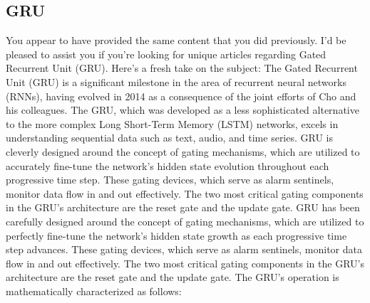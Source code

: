 \documentclass[a4paper,fleqn]{cas-sc}
\begin{document}

\subsection{GRU}
You appear to have provided the same content that you did previously. I’d be pleased to assist you if you’re looking for unique articles regarding Gated Recurrent Unit (GRU). Here’s a fresh take on the subject:
The Gated Recurrent Unit (GRU) is a significant milestone in the area of recurrent neural networks (RNNs), having evolved in 2014 as a consequence of the joint efforts of Cho and his colleagues. The GRU, which was developed as a less sophisticated alternative to the more complex Long Short-Term Memory (LSTM) networks, excels in understanding sequential data such as text, audio, and time series. GRU is cleverly designed around the concept of gating mechanisms, which are utilized to accurately fine-tune the network’s hidden state evolution throughout each progressive time step. These gating devices, which serve as alarm sentinels, monitor data flow in and out effectively.\cite{he2019wind} The two most critical gating components in the GRU’s architecture are the reset gate and the update gate. GRU has been carefully designed
around the concept of gating mechanisms, which are utilized to perfectly fine-tune the network’s hidden state growth as each progressive time step advances. These gating devices, which serve as alarm sentinels, monitor data flow in and out effectively. The two most critical gating components in the GRU’s architecture are the reset gate and the update gate. The GRU’s operation is mathematically characterized as follows:
\end{document}
